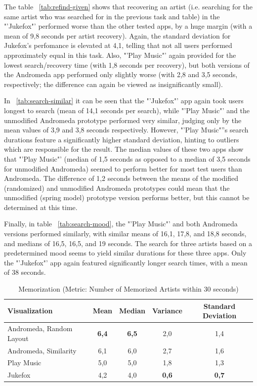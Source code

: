 The table ~\ref{tab:refind-given} shows that recovering an artist (i.e. searching for the same artist who was searched for in the previous task and table) in the "'Jukefox"' performed worse than the other tested apps, by a huge margin (with a mean of 9,8 seconds per artist recovery). Again, the standard deviation for Jukefox's perfomance is elevated at 4,1, telling that not all users performed approximately equal in this task. Also, "'Play Music"' again provided for the lowest search/recovery time (with 1,8 seconds per recovery), but both versions of the Andromeda app performed only slightly worse (with 2,8 and 3,5 seconds, respectively; the difference can again be viewed as insignificantly small).

In ~\ref{tab:search-similar} it can be seen that the "'Jukefox"' app again took users longest to search (mean of 14,1 seconds per search), while "'Play Music"' and the unmodified Andromeda prototype performed very similar, judging only by the mean values of 3,9 and 3,8 seconds respectively. However, "'Play Music"''s search durations feature a significantly higher standard deviation, hinting to outliers which are responsible for the result. The median values of these two apps show that "'Play Music"' (median of 1,5 seconds as opposed to a median of 3,5 seconds for unmodified Andromeda) seemed to perform better for most test users than Andromeda. The difference of 1,2 seconds between the means of the modified (randomized) and unmodified Andromeda prototypes could mean that the unmodified (spring model) prototype version performs better, but this cannot be determined at this time.

Finally, in table ~\ref{tab:search-mood}, the "'Play Music"' and both Andromeda versions performed similarly, with similar means of 16,1, 17,8, and 18,8 seconds, and medians of 16,5, 16,5, and 19 seconds. The search for three artists based on a predetermined mood seems to yield similar durations for these three apps. Only the "'Jukefox"' app again featured significantly longer search times, with a mean of 38 seconds. 
 

\begin{table}[H]
\begin{center}
\begin{tabular}{ | l | c | c | c | c |}
	\hline
	\textbf{Visualization} & \textbf{Mean} & \textbf{Median} & \textbf{Variance} & \textbf{Standard Deviation}\\ \hline
	Andromeda, Random Layout & \textbf{6,4} & \textbf{6,5} & 2,0 & 1,4 \\ \hline
	Andromeda, Similarity & 6,1 & 6,0 & 2,7 & 1,6 \\ \hline
	Play Music & 5,0 & 5,0 & 1,8 & 1,3 \\ \hline
	Jukefox & 4,2 & 4,0 & \textbf{0,6} & \textbf{0,7} \\ \hline
\end{tabular}
\caption {Memorization (Metric: Number of Memorized Artists within 30 seconds)} \label{tab:memorization} 
\end{center}
\end{table}

